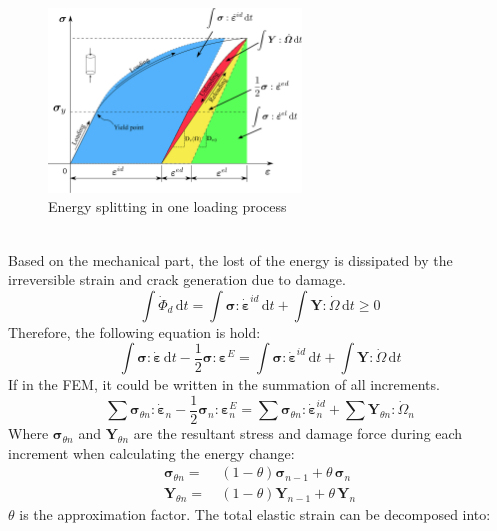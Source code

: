 \documentclass[preprint,review,12pt]{elsarticle}
\newcommand{\ud}{\textrm{d}}
\begin{document}
\begin{figure}[htbp]
   \centering
   \includegraphics[width=0.6\textwidth]{inkscape/energy_split/energy_split2.eps}
   \caption{Energy splitting in one loading process}
   \label{fig:energysplit2}
\end{figure}
\
\\
Based on the mechanical part, the lost of the energy is dissipated by the irreversible strain and crack generation due to damage.
%
\begin{equation}\label{eq:elost2}
   \int \dot\varPhi_{d} \, \ud t = \int\bm\sigma:\dot{\bm\varepsilon}^{id}\,\textrm{d}t + \int \bm{Y}:\dot{\bm\varOmega}\,\ud t \ge 0
\end{equation}
%
Therefore, the following equation is hold:
%
\begin{equation}
   \label{eq:energy2}
   \int \bm\sigma:\dot{\bm\varepsilon}\,\ud t -\frac{1}{2}\bm\sigma:\bm\varepsilon^E = \int \bm\sigma:\dot{\bm\varepsilon}^{id}\,\ud t+\int \bm{Y}:\dot{\bm\varOmega}\,\ud t
\end{equation}
%
If in the FEM, it could be written in the summation of all increments.
%
\begin{equation}
   \label{eq:energyFEM1}
   \sum \bm\sigma_{\theta n}:\dot{\bm\varepsilon}_n -\frac{1}{2}\bm\sigma_n:\bm\varepsilon^E_{n} = \sum \bm\sigma_{\theta n}:\dot{\bm\varepsilon}^{id}_n+\sum \bm{Y}_{\theta n}:\dot{\bm\varOmega}_{n}
\end{equation}
Where $\bm\sigma_{\theta n}$ and $\bm{Y}_{\theta n}$ are the resultant stress and damage force during each increment when calculating the energy change:
\begin{align}
    \bm\sigma_{\theta n} = & \ (1-\theta)\bm\sigma_{n-1} + \theta \, \bm\sigma_{n} \\
    \bm{Y}_{\theta n} = & \ (1-\theta)\bm{Y}_{n-1} + \theta \, \bm{Y}_{n}
\end{align}
$\theta$ is the approximation factor.
The total elastic strain can be decomposed into:
\end{document}
